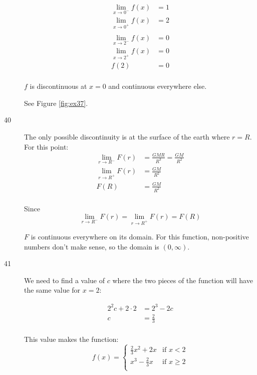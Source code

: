 \documentclass[letterpaper, landscape]{exam}
\begin{document}
\begin{description}
        \begin{align*}
          \lim_{x \to 0^-} f(x) & = 1 \\
          \lim_{x \to 0^+} f(x) & = 2 \\
          \\
          \lim_{x \to 2^-} f(x) & = 0 \\
          \lim_{x \to 2^+} f(x) & = 0 \\
          f(2)                  & = 0 \\
        \end{align*}

        $f$ is discontinuous at $x = 0$ and continuous everywhere else.

        See Figure \ref{fig:ex37}.

      \item[40]
        The only possible discontinuity is at the surface of the earth where $r = R$. For this point:
        \begin{align*}
          \lim_{r \to R^-} F(r) & = \frac{GMR}{R^3} = \frac{GM}{R^2} \\
          \lim_{r \to R^+} F(r) & = \frac{GM}{R^2} \\
          F(R)                  & = \frac{GM}{R^2} \\
        \end{align*}

        Since
        \[
          \lim_{r \to R^-} F(r) = \lim_{r \to R^+} F(r) = F(R)
        \]

        $F$ is continuous everywhere on its domain. For this function, non-positive
        numbers don't make sense, so the domain is $(0, \infty)$.

      \item[41]
        We need to find a value of $c$ where the two pieces of the function will have the
        same value for $x = 2$:

        \begin{align*}
          2^2 c + 2 \cdot 2 & = 2^3 - 2c \\
          c                 & = \frac{2}{3} \\
        \end{align*}

        This value makes the function:
        \[
          f(x) = 
            \begin{cases}
              \frac{2}{3} x^2 + 2x & \text{if } x < 2 \\
              x^3 - \frac{2}{3} x  & \text{if } x \geq 2 \\
            \end{cases}
        \]


\end{description}
\end{document}

